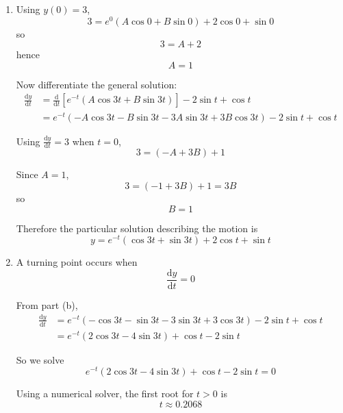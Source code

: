 \documentclass[leqno]{article}
\begin{document}
\begin{enumerate}[
  label=\textbf{\arabic*.},
  leftmargin=*,
  topsep=0pt,
  partopsep=0pt,
  parsep=0pt
]
\begin{tcolorbox}[colback=white, colframe=scarlet, title={\textbf{Solution}}, breakable, grow to left by=6mm, grow to right by=10mm]
\begin{enumerate}[label=\textbf{(\alph*)}]
Comparing coefficients with \(20\cos t+5\sin t\),
\[
9C+2D=20,\qquad 9D-2C=5
\]

Solve these simultaneous equations:
\begin{align*}
9(9C+2D)&=9(20)\\
2(9D-2C)&=2(5)
\end{align*}
so
\begin{align*}
81C+18D&=180\\
-4C+18D&=10
\end{align*}

Subtracting,
\[
85C=170
\]
so
\[
C=2
\]

Substituting into \(9C+2D=20\),
\[
18+2D=20
\]
hence
\[
D=1
\]

Therefore
\[
y_p=2\cos t+\sin t
\]

So the general solution is
\[
y=e^{-t}(A\cos 3t+B\sin 3t)+2\cos t+\sin t
\]

  \item Using \(y(0)=3\),
\[
3=e^0(A\cos 0+B\sin 0)+2\cos 0+\sin 0
\]
so
\[
3=A+2
\]
hence
\[
A=1
\]

Now differentiate the general solution:
\begin{align*}
\frac{\mathrm{d}y}{\mathrm{d}t}
&=\frac{\mathrm{d}}{\mathrm{d}t}\left[e^{-t}(A\cos 3t+B\sin 3t)\right]-2\sin t+\cos t\\
&=e^{-t}(-A\cos 3t-B\sin 3t-3A\sin 3t+3B\cos 3t)-2\sin t+\cos t
\end{align*}

Using \(\frac{\mathrm{d}y}{\mathrm{d}t}=3\) when \(t=0\),
\[
3=(-A+3B)+1
\]

Since \(A=1\),
\[
3=(-1+3B)+1=3B
\]
so
\[
B=1
\]

Therefore the particular solution describing the motion is
\[
y=e^{-t}(\cos 3t+\sin 3t)+2\cos t+\sin t
\]

  \item A turning point occurs when
\[
\frac{\mathrm{d}y}{\mathrm{d}t}=0
\]

From part (b),
\begin{align*}
\frac{\mathrm{d}y}{\mathrm{d}t}
&=e^{-t}(-\cos 3t-\sin 3t-3\sin 3t+3\cos 3t)-2\sin t+\cos t\\
&=e^{-t}(2\cos 3t-4\sin 3t)+\cos t-2\sin t
\end{align*}

So we solve
\[
e^{-t}(2\cos 3t-4\sin 3t)+\cos t-2\sin t=0
\]

Using a numerical solver, the first root for \(t>0\) is
\[
t\approx 0.2068
\]


\end{enumerate}
\end{tcolorbox}
\end{enumerate}
\end{document}
